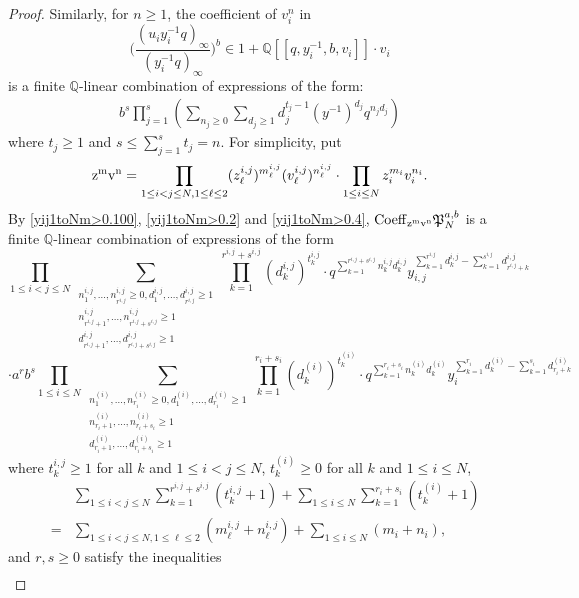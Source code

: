 \documentclass[12pt, reqno]{amsart}
\theoremstyle{definition}
\theoremstyle{remark}
\numberwithin{equation}{section}
\newcommand{\Coe}{ {\rm Coeff} }
\newcommand{\Q}{ \mathbb Q }
\numberwithin{equation}{section}
\begin{document}
\begin{proof}
Similarly, for $n \ge 1$, the coefficient of $v_i^n$ in 
$$
   \bigg (\frac{(u_iy_i^{-1}q)_\infty}{(y_i^{-1}q)_\infty} \bigg )^b
\in 1 + \Q[[q, y_i^{-1}, b, v_i]] \cdot v_i 
$$
is a finite $\Q$-linear combination of expressions of the form:
\begin{eqnarray}   \label{yij1toNm>0.4}
b^s \prod_{j=1}^s \left (\sum_{n_j \ge 0} \sum_{d_j \ge 1} 
d_j^{t_j-1} (y^{-1})^{d_j}q^{n_j d_j} \right )
\end{eqnarray}
where $t_j \ge 1$ and $s \le \sum_{j=1}^s t_j = n$. For simplicity, put 
$$
  {\rm z^mv^n} 
= \prod_{1 \le i < j \le N, 1 \le \ell \le 2} (z_\ell^{i,j})^{m_\ell^{i,j}}
  (v_\ell^{i,j})^{n_\ell^{i,j}} \cdot \prod_{1 \le i \le N} 
  z_i^{m_i} v_i^{n_i}.
$$
By \eqref{yij1toNm>0.100}, \eqref{yij1toNm>0.2} and \eqref{yij1toNm>0.4},
$\Coe_{{\rm z^mv^n}} \mathfrak P_N^{a,b}$
is a finite $\Q$-linear combination of expressions of the form
$$ 
\prod_{1 \le i < j \le N}
\sum_{\substack{n_1^{i,j}, \ldots, n_{r^{i,j}}^{i,j} \ge 0, 
    d_1^{i,j}, \ldots, d_{r^{i,j}}^{i,j} \ge 1\\
    n_{r^{i,j}+1}^{i,j}, \ldots, n_{r^{i,j}+s^{i,j}}^{i,j} \ge 1\\
    d_{r^{i,j}+1}^{i,j}, \ldots, d_{r^{i,j}+s^{i,j}}^{i,j} \ge 1}}
  \prod_{k=1}^{r^{i,j}+s^{i,j}} (d_k^{i,j})^{t_k^{i,j}} 
\cdot q^{\sum_{k=1}^{r^{i,j}+s^{i,j}} n_k^{i,j} d_k^{i,j}}
  y_{i,j}^{\sum_{k=1}^{r^{i,j}} d_k^{i,j} 
    - \sum_{k=1}^{s^{i,j}} d_{r^{i,j}+k}^{i,j}}
$$
$$
\cdot a^rb^s \prod_{1 \le i \le N}
\sum_{\substack{n_1^{(i)}, \ldots, n_{r_i}^{(i)} \ge 0, 
    d_1^{(i)}, \ldots, d_{r_i}^{(i)} \ge 1\\
    n_{r_i+1}^{(i)}, \ldots, n_{r_i+s_i}^{(i)} \ge 1\\
    d_{r_i+1}^{(i)}, \ldots, d_{r_i+s_i}^{(i)} \ge 1}}
  \prod_{k=1}^{r_i+s_i} (d_k^{(i)})^{t_k^{(i)}}
\cdot q^{\sum_{k=1}^{r_i+s_i} n_k^{(i)} d_k^{(i)}}
  y_i^{\sum_{k=1}^{r_i} d_k^{(i)} 
    - \sum_{k=1}^{s_i} d_{r_i+k}^{(i)}}
$$
where $t_k^{i,j} \ge 1$ for all $k$ and $1 \le i < j \le N$, 
$t_k^{(i)} \ge 0$ for all $k$ and $1 \le i \le N$, 
\begin{eqnarray}    \label{yij1toNm>0.5}
& &\sum_{1 \le i < j \le N} \sum_{k=1}^{r^{i,j}+s^{i,j}} (t_k^{i,j} +1)
   + \sum_{1 \le i \le N} \sum_{k=1}^{r_i+s_i} (t_k^{(i)} +1)
   \nonumber   \\
&=&\sum_{1 \le i < j \le N, 1 \le \ell \le 2} (m_\ell^{i,j} + n_\ell^{i,j})
   + \sum_{1 \le i \le N} (m_i + n_i),
\end{eqnarray}
and $r, s \ge 0$ satisfy the inequalities
\begin{eqnarray}    \label{yij1toNm>0.6}

\end{eqnarray}
\end{proof}
\end{document}
